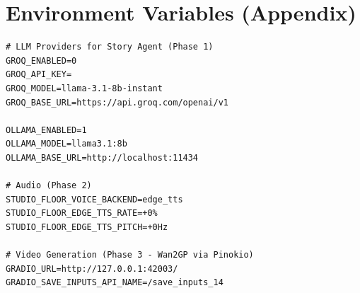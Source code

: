 \documentclass[runningheads]{llncs}
\begin{document}
\section{Environment Variables (Appendix)}
\begin{lstlisting}
# LLM Providers for Story Agent (Phase 1)
GROQ_ENABLED=0
GROQ_API_KEY=
GROQ_MODEL=llama-3.1-8b-instant
GROQ_BASE_URL=https://api.groq.com/openai/v1

OLLAMA_ENABLED=1
OLLAMA_MODEL=llama3.1:8b
OLLAMA_BASE_URL=http://localhost:11434

# Audio (Phase 2)
STUDIO_FLOOR_VOICE_BACKEND=edge_tts
STUDIO_FLOOR_EDGE_TTS_RATE=+0%
STUDIO_FLOOR_EDGE_TTS_PITCH=+0Hz

# Video Generation (Phase 3 - Wan2GP via Pinokio)
GRADIO_URL=http://127.0.0.1:42003/
GRADIO_SAVE_INPUTS_API_NAME=/save_inputs_14
\end{lstlisting}
\end{document}
